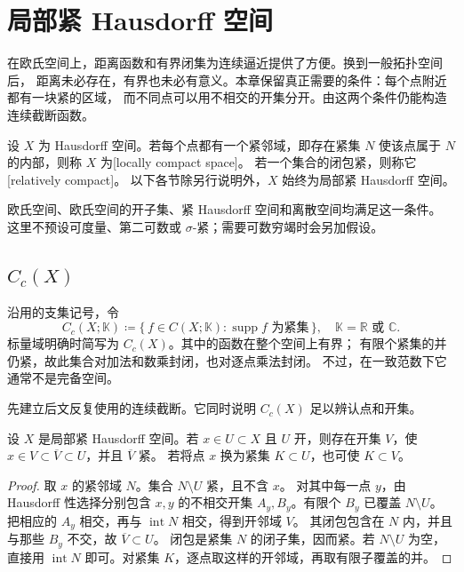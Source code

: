 \section{局部紧 Hausdorff 空间}
\label{b1:sec:1101}

在欧氏空间上，距离函数和有界闭集为连续逼近提供了方便。换到一般拓扑空间后，
距离未必存在，有界也未必有意义。本章保留真正需要的条件：每个点附近都有一块紧的区域，
而不同点可以用不相交的开集分开。由这两个条件仍能构造连续截断函数。

\begin{definition}\label{b1:def:lch-space}
设 \(X\) 为 Hausdorff 空间。若每个点都有一个紧邻域，即存在紧集 \(N\) 使该点属于
\(N\) 的内部，则称 \(X\) 为[locally compact space]。
若一个集合的闭包紧，则称它[relatively compact]。
以下各节除另行说明外，\(X\) 始终为局部紧 Hausdorff 空间。
\end{definition}

欧氏空间、欧氏空间的开子集、紧 Hausdorff 空间和离散空间均满足这一条件。
这里不预设可度量、第二可数或 \(\sigma\)-紧；需要可数穷竭时会另加假设。

\subsection{\texorpdfstring{\(C_c(X)\)}{Cc(X)}}
\label{b1:subsec:110101}

沿用的支集记号，令
\[
 C_c(X;\mathbb K)\coloneqq\{\,f\in C(X;\mathbb K):\operatorname{supp}f\text{ 为紧集}\,\},
 \quad \mathbb K=\mathbb R\text{ 或 }\mathbb C.
\]
标量域明确时简写为 \(C_c(X)\)。其中的函数在整个空间上有界；
有限个紧集的并仍紧，故此集合对加法和数乘封闭，也对逐点乘法封闭。
不过，在一致范数下它通常不是完备空间。

\ProseParagraphBreak

先建立后文反复使用的连续截断。它同时说明 \(C_c(X)\) 足以辨认点和开集。

\begin{lemma}\label{b1:lem:lch-shrink}
设 \(X\) 是局部紧 Hausdorff 空间。若 \(x\in U\subset X\) 且 \(U\) 开，则存在开集 \(V\)，使
\(x\in V\subset\overline V\subset U\)，并且 \(\overline V\) 紧。
若将点 \(x\) 换为紧集 \(K\subset U\)，也可使 \(K\subset V\)。
\end{lemma}
\begin{proof}
取 \(x\) 的紧邻域 \(N\)。集合 \(N\setminus U\) 紧，且不含 \(x\)。
对其中每一点 \(y\)，由 Hausdorff 性选择分别包含 \(x,y\) 的不相交开集
\(A_y,B_y\)。有限个 \(B_y\) 已覆盖 \(N\setminus U\)。
把相应的 \(A_y\) 相交，再与 \(\operatorname{int}N\) 相交，得到开邻域 \(V\)。
其闭包包含在 \(N\) 内，并且与那些 \(B_y\) 不交，故 \(\overline V\subset U\)。
闭包是紧集 \(N\) 的闭子集，因而紧。若 \(N\setminus U\) 为空，直接用
\(\operatorname{int}N\) 即可。对紧集 \(K\)，逐点取这样的开邻域，再取有限子覆盖的并。
\end{proof}

